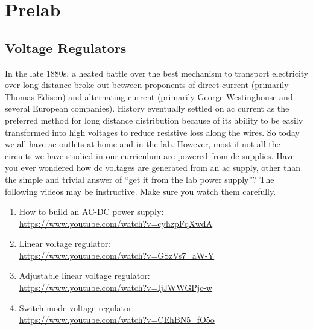 \documentclass[letterpaper, 11pt]{article}
\begin{document}

\section{Prelab}
\subsection{Voltage Regulators}
In the late 1880s, a heated battle over the best mechanism to transport electricity over long distance broke out between proponents of direct current (primarily Thomas Edison) and alternating current (primarily George Westinghouse and several European companies). History eventually settled on ac current as the preferred method for long distance distribution because of its ability to be easily transformed into high voltages to reduce resistive loss along the wires. So today we all have ac outlets at home and in the lab. However, most if not all the circuits we have studied in our curriculum are powered from dc supplies. Have you ever wondered how dc voltages are generated from an ac supply, other than the simple and trivial answer of ``get it from the lab power supply''? The following videos may be instructive. Make sure you watch them carefully. 

\begin{enumerate}
	\item How to build an AC-DC power supply:\\ \url{https://www.youtube.com/watch?v=cyhzpFqXwdA} 
	\item Linear voltage regulator:\\ \url{https://www.youtube.com/watch?v=GSzVs7_aW-Y}
	\item Adjustable linear voltage regulator:\\  \url{https://www.youtube.com/watch?v=IjJWWGPjc-w}
	\item Switch-mode voltage regulator:\\ \url{https://www.youtube.com/watch?v=CEhBN5_fO5o}
\end{enumerate}
\end{document}
